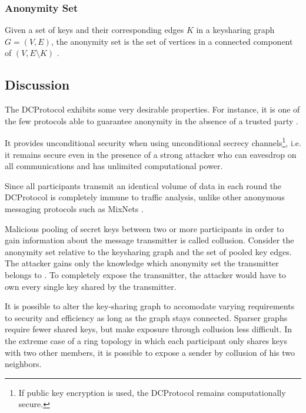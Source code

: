 \subsubsection{Anonymity Set}

Given a set of keys and their corresponding edges $K$ in a keysharing graph $G = (V, E)$, the anonymity set is the set of vertices in a connected component of $(V, E \setminus K)$ \cite{journals/joc/Chaum88}.


\subsection{Discussion}

The \ac{DCProtocol} exhibits some very desirable properties. For instance, it is one of the few
protocols able to guarantee anonymity in the absence of a trusted party \cite{juels2004dining}.

It provides unconditional security when using unconditional secrecy channels\footnote{
If public key encryption is used, the \ac{DCProtocol} remains computationally secure.},
i.e. it remains secure even in the presence of a
strong attacker who can eavesdrop on all communications and has unlimited computational power.

Since all participants transmit an identical volume of data in each round the \ac{DCProtocol}
is completely immune to traffic analysis, unlike other anonymous messaging protocols such
as \acp{MixNet} \cite{journals/cacm/Chaum81}.

Malicious pooling of secret keys between two or more participants in order to
gain information about the message transmitter is called collusion.
Consider the anonymity set relative to the keysharing graph and the set of pooled key edges.
The attacker gains only the knowledge which anonymity set the transmitter belongs to \cite{journals/joc/Chaum88}. To completely expose the transmitter, the attacker would
have to own every single key shared by the transmitter.

It is possible to alter the key-sharing graph to accomodate varying requirements to
security and efficiency as long as the graph stays connected. Sparser graphs require fewer
shared keys, but make exposure through collusion less difficult. In the extreme case of
a ring topology in which each participant only shares keys with two other members, it is
possible to expose a sender by collusion of his two neighbors.

